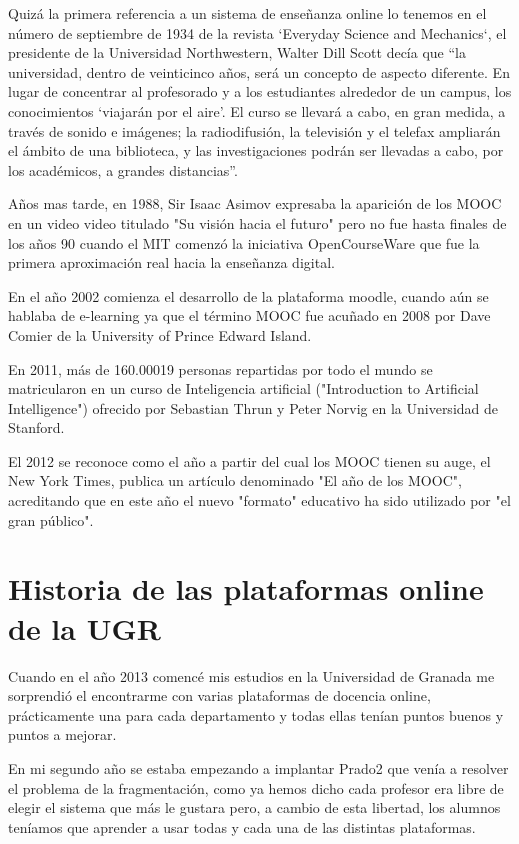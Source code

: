 Quizá la primera referencia a un sistema de enseñanza online lo tenemos en el número de septiembre de 1934 de la revista ‘Everyday Science and Mechanics‘, el presidente de la Universidad Northwestern, Walter Dill Scott decía que ``la universidad, dentro de veinticinco años, será un concepto de aspecto diferente. En lugar de concentrar al profesorado y a los estudiantes alrededor de un campus, los conocimientos ‘viajarán por el aire’. El curso se llevará a cabo, en gran medida, a través de sonido e imágenes; la radiodifusión, la televisión y el telefax ampliarán el ámbito de una biblioteca, y las investigaciones podrán ser llevadas a cabo, por los académicos, a grandes distancias''\cite{art_12}.

\bigskip
Años mas tarde, en 1988, Sir Isaac Asimov expresaba la aparición de los MOOC en un video video titulado "Su visión hacia el futuro" pero no fue hasta finales de los años 90 cuando el MIT comenzó la iniciativa OpenCourseWare que fue la primera aproximación real hacia la enseñanza digital.

\bigskip
En el año 2002 comienza el desarrollo de la plataforma moodle, cuando aún se hablaba de e-learning ya que el término MOOC fue acuñado en 2008 por Dave Comier de la University of Prince Edward Island.

\bigskip
En 2011, más de 160.00019 personas repartidas por todo el mundo se matricularon en un curso de Inteligencia artificial ("Introduction to Artificial Intelligence") ofrecido por Sebastian Thrun y Peter Norvig en la Universidad de Stanford.

\bigskip
El 2012 se reconoce como el año a partir del cual los MOOC tienen su auge, el New York Times, publica un artículo denominado "El año de los MOOC", acreditando que en este año el nuevo "formato" educativo ha sido utilizado por "el gran público".

\section{Historia de las plataformas online de la UGR}

Cuando en el año 2013 comencé mis estudios en la Universidad de Granada me sorprendió el encontrarme con varias plataformas de docencia online, prácticamente una para cada departamento y todas ellas tenían puntos buenos y puntos a mejorar.

\bigskip
En mi segundo año se estaba empezando a implantar Prado2 que venía a resolver el problema de la fragmentación, como ya hemos dicho cada profesor era libre de elegir el sistema que más le gustara pero, a cambio de esta libertad, los alumnos teníamos que aprender a usar todas y cada una de las distintas plataformas.

